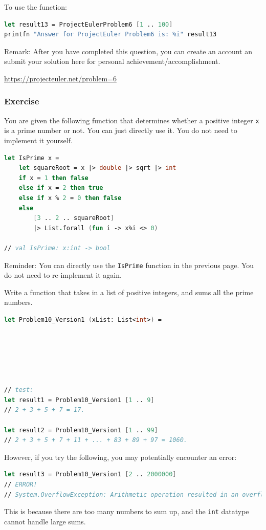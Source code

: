 \documentclass[12pt]{article}
\begin{document}
To use the function:
\begin{lstlisting}[language=FSharp]
let result13 = ProjectEulerProblem6 [1 .. 100]
printfn "Answer for ProjectEuler Problem6 is: %i" result13
\end{lstlisting}
Remark: After you have completed this question, you can create an account an submit your solution here for personal achievement/accomplishment.

\url{https://projecteuler.net/problem=6}

\subsubsection*{Exercise}
You are given the following function that determines whether a positive integer \texttt{x} is a prime number or not. You can just directly use it. You do not need to implement it yourself.
\begin{lstlisting}[language=FSharp]
let IsPrime x =
    let squareRoot = x |> double |> sqrt |> int 
    if x = 1 then false
    else if x = 2 then true
    else if x % 2 = 0 then false
    else 
        [3 .. 2 .. squareRoot]
        |> List.forall (fun i -> x%i <> 0)

// val IsPrime: x:int -> bool
\end{lstlisting}
Reminder: You can directly use the \texttt{IsPrime} function in the previous page. You do not need to re-implement it again.

Write a function that takes in a list of positive integers, and sums all the prime numbers.
\begin{lstlisting}[language=FSharp]
let Problem10_Version1 (xList: List<int>) =






// test:
let result1 = Problem10_Version1 [1 .. 9]
// 2 + 3 + 5 + 7 = 17.

let result2 = Problem10_Version1 [1 .. 99]
// 2 + 3 + 5 + 7 + 11 + ... + 83 + 89 + 97 = 1060.
\end{lstlisting}
However, if you try the following, you may potentially encounter an error:
\begin{lstlisting}[language=FSharp]
let result3 = Problem10_Version1 [2 .. 2000000]
// ERROR!
// System.OverflowException: Arithmetic operation resulted in an overflow.
\end{lstlisting}
This is because there are too many numbers to sum up, and the \texttt{int} datatype cannot handle large sums.
\end{document}
